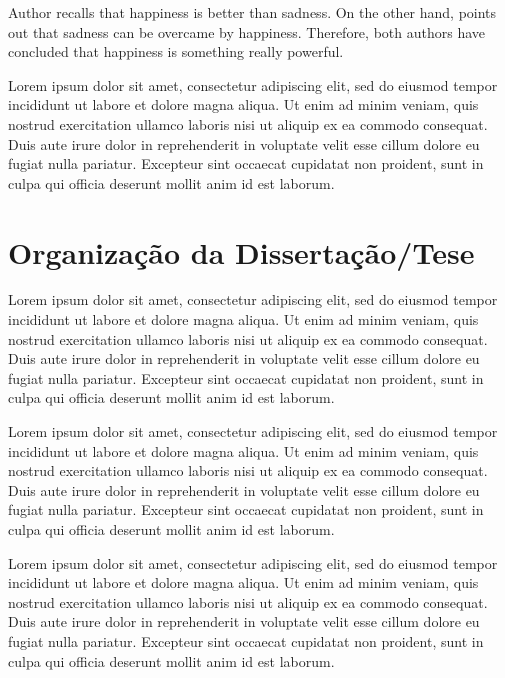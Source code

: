 Author recalls that happiness is better than sadness. On the other hand, points out that sadness can be overcame by happiness. Therefore, both authors have concluded that happiness is something really powerful.

Lorem ipsum dolor sit amet, consectetur adipiscing elit, sed do eiusmod tempor incididunt ut labore et dolore magna aliqua. Ut enim ad minim veniam, quis nostrud exercitation ullamco laboris nisi ut aliquip ex ea commodo consequat. Duis aute irure dolor in reprehenderit in voluptate velit esse cillum dolore eu fugiat nulla pariatur. Excepteur sint occaecat cupidatat non proident, sunt in culpa qui officia deserunt mollit anim id est laborum.



\section*{Organização da Dissertação/Tese}

Lorem ipsum dolor sit amet, consectetur adipiscing elit, sed do eiusmod tempor incididunt ut labore et dolore magna aliqua. Ut enim ad minim veniam, quis nostrud exercitation ullamco laboris nisi ut aliquip ex ea commodo consequat. Duis aute irure dolor in reprehenderit in voluptate velit esse cillum dolore eu fugiat nulla pariatur. Excepteur sint occaecat cupidatat non proident, sunt in culpa qui officia deserunt mollit anim id est laborum.

Lorem ipsum dolor sit amet, consectetur adipiscing elit, sed do eiusmod tempor incididunt ut labore et dolore magna aliqua. Ut enim ad minim veniam, quis nostrud exercitation ullamco laboris nisi ut aliquip ex ea commodo consequat. Duis aute irure dolor in reprehenderit in voluptate velit esse cillum dolore eu fugiat nulla pariatur. Excepteur sint occaecat cupidatat non proident, sunt in culpa qui officia deserunt mollit anim id est laborum.

Lorem ipsum dolor sit amet, consectetur adipiscing elit, sed do eiusmod tempor incididunt ut labore et dolore magna aliqua. Ut enim ad minim veniam, quis nostrud exercitation ullamco laboris nisi ut aliquip ex ea commodo consequat. Duis aute irure dolor in reprehenderit in voluptate velit esse cillum dolore eu fugiat nulla pariatur. Excepteur sint occaecat cupidatat non proident, sunt in culpa qui officia deserunt mollit anim id est laborum.















